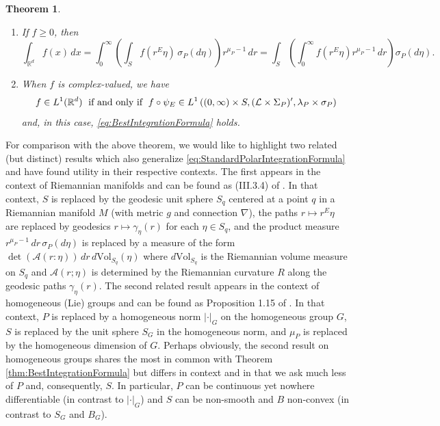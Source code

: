 \documentclass[11pt]{article}
\newtheorem{theorem}{Theorem}[section]
\theoremstyle{remark}
\renewcommand\det{\operatorname{det}}
\begin{document}
\begin{theorem}
\begin{enumerate}
\begin{enumerate}
\item If $f\geq 0$, then
\begin{equation}\label{eq:BestIntegrationFormula}
\int_{\mathbb{R}^d}f(x)\,dx=\int_0^\infty\left(\int_S f(r^E\eta)\,\sigma_P(d\eta)\right)r^{\mu_P-1}\,dr=\int_S\left(\int_0^\infty f(r^E\eta)r^{\mu_P-1}\,dr\right)\sigma_P(d\eta).
\end{equation}
\item When $f$ is complex-valued, we have 
\begin{equation*}
    f\in L^1(\mathbb{R}^d)\hspace{.1cm}\mbox{ if and only if }\hspace{.1cm}f\circ\psi_E \in  L^1\left((0,\infty)\times S,(\mathcal{L}\times\Sigma_P)',\lambda_P\times\sigma_P\right)
\end{equation*} and, in this case, \eqref{eq:BestIntegrationFormula} holds.
\end{enumerate}
\end{enumerate}
\end{theorem}

\noindent For comparison with the above theorem, we would like to highlight two related (but distinct) results which also generalize \eqref{eq:StandardPolarIntegrationFormula} and have found utility in their respective contexts. The first appears in the context of Riemannian manifolds and can be found as (III.3.4) of \cite{chavel_riemannian_2006}. In that context, $S$ is replaced by the geodesic unit sphere $S_q$ centered at a point $q$ in a Riemannian manifold $M$ (with metric $g$ and connection $\nabla$), the paths $r\mapsto r^E\eta$ are replaced by geodesics $r\mapsto \gamma_\eta(r)$ for each $\eta\in S_q$, and the product measure $r^{\mu_P-1}\,dr\,\sigma_P(d\eta)$ is replaced by a measure of the form $\det(\mathcal{A}(r:\eta))\,dr\, d\mbox{Vol}_{S_q}(\eta)$ where $d\mbox{Vol}_{S_q}$ is the Riemannian volume measure on $S_q$ and $\mathcal{A}(r;\eta)$ is determined by the Riemannian curvature $R$ along the geodesic paths $\gamma_{\eta}(r)$. The second related result appears in the context of homogeneous (Lie) groups and can be found as Proposition 1.15 of \cite{folland_hardy_1982}. In that context, $P$ is replaced by a homogeneous norm $|\cdot|_G$ on the homogeneous group $G$, $S$ is replaced by  the unit sphere $S_G$ in the homogeneous norm, and $\mu_P$ is replaced by the homogeneous dimension of $G$. Perhaps obviously, the second result on homogeneous groups shares the most in common with Theorem \ref{thm:BestIntegrationFormula} but differs in context and in that we ask much less of $P$ and, consequently, $S$. In particular, $P$ can be continuous yet nowhere differentiable (in contrast to $|\cdot|_G$) and $S$ can be non-smooth and $B$ non-convex (in contrast to $S_G$ and $B_G$).\\
\end{document}
